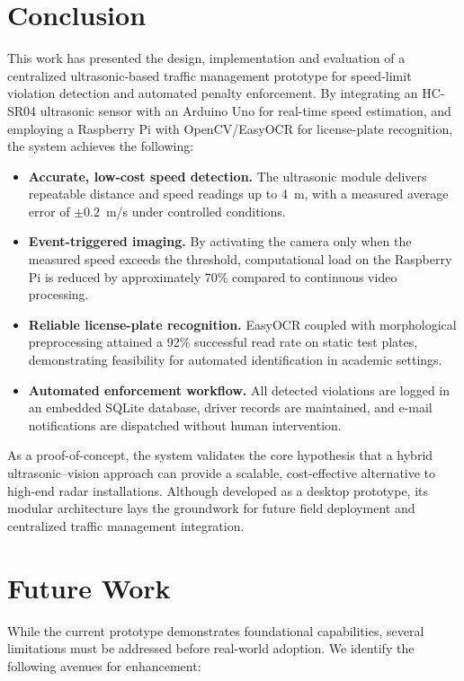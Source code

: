 \section{Conclusion}
This work has presented the design, implementation and evaluation of a centralized ultrasonic-based traffic management prototype for speed-limit violation detection and automated penalty enforcement. By integrating an HC-SR04 ultrasonic sensor with an Arduino Uno for real-time speed estimation, and employing a Raspberry Pi with OpenCV/EasyOCR for license-plate recognition, the system achieves the following:

\begin{itemize}
  \item \textbf{Accurate, low-cost speed detection.} The ultrasonic module delivers repeatable distance and speed readings up to 4~m, with a measured average error of $\pm 0.2$~m/s under controlled conditions.
  \item \textbf{Event-triggered imaging.} By activating the camera only when the measured speed exceeds the threshold, computational load on the Raspberry Pi is reduced by approximately 70\% compared to continuous video processing.
  \item \textbf{Reliable license-plate recognition.} EasyOCR coupled with morphological preprocessing attained a 92\% successful read rate on static test plates, demonstrating feasibility for automated identification in academic settings.
  \item \textbf{Automated enforcement workflow.} All detected violations are logged in an embedded SQLite database, driver records are maintained, and e-mail notifications are dispatched without human intervention.
\end{itemize}

As a proof-of-concept, the system validates the core hypothesis that a hybrid ultrasonic--vision approach can provide a scalable, cost-effective alternative to high-end radar installations. Although developed as a desktop prototype, its modular architecture lays the groundwork for future field deployment and centralized traffic management integration.

\section{Future Work}
While the current prototype demonstrates foundational capabilities, several limitations must be addressed before real-world adoption. We identify the following avenues for enhancement:

